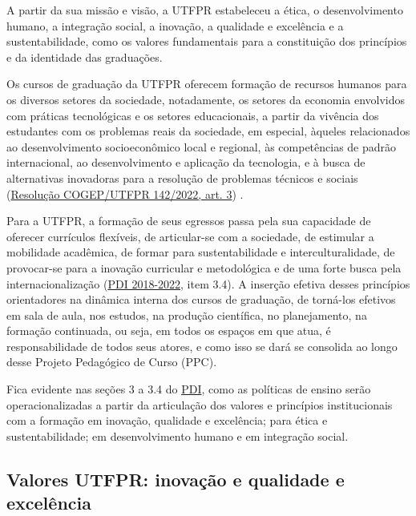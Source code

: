 A partir da sua missão e visão, a UTFPR estabeleceu a ética, o desenvolvimento humano, a integração social, a inovação, a qualidade e excelência e a sustentabilidade, como os valores fundamentais para a constituição dos princípios e da identidade das graduações.

Os cursos de graduação da UTFPR oferecem formação de recursos humanos para os diversos setores da sociedade, notadamente, os setores da economia envolvidos com práticas tecnológicas e os setores educacionais, a partir da vivência dos estudantes com os problemas reais da sociedade, em especial, àqueles relacionados ao desenvolvimento socioeconômico local e regional, às competências de padrão internacional, ao desenvolvimento e aplicação da tecnologia, e à busca de alternativas inovadoras para a resolução de problemas técnicos e sociais (\href{https://sei.utfpr.edu.br/sei/publicacoes/controlador_publicacoes.php?acao=publicacao_visualizar&id_documento=2803898&id_orgao_publicacao=0}{Resolução COGEP/UTFPR 142/2022, art. 3\textordmasculine}) \nocite{cogep142}.

Para a UTFPR, a formação de seus egressos passa pela sua capacidade de oferecer currículos flexíveis, de articular-se com a sociedade, de estimular a mobilidade acadêmica, de formar para sustentabilidade e interculturalidade, de provocar-se para a inovação curricular e metodológica e de uma forte busca pela internacionalização (\href{https://cloud.utfpr.edu.br/index.php/s/15P0OcMLMdt9Rv7}{PDI 2018-2022}, item 3.4\nocite{pdiutfpr}). A inserção efetiva desses princípios orientadores na dinâmica interna dos cursos de graduação, de torná-los efetivos em sala de aula, nos estudos, na produção científica, no planejamento, na formação continuada, ou seja, em todos os espaços em que atua, é responsabilidade de todos seus atores, e como isso se dará se consolida ao longo desse Projeto Pedagógico de Curso (PPC).


Fica evidente nas seções 3 a 3.4 do \href{https://cloud.utfpr.edu.br/index.php/s/15P0OcMLMdt9Rv7}{PDI}, como as políticas de ensino serão operacionalizadas a partir da articulação dos valores e princípios institucionais com a formação em inovação, qualidade e excelência; para ética e sustentabilidade; em desenvolvimento humano e em integração social.

\subsection{Valores UTFPR: inovação e qualidade e excelência}

